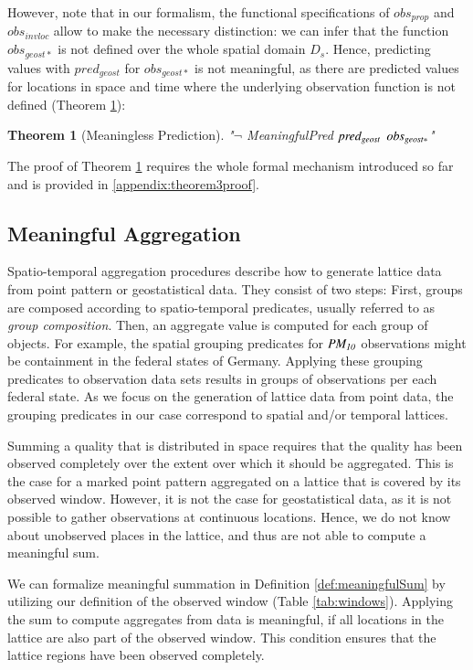 \documentclass[final,authoryear,1p,times]{elsarticle}
\newtheorem{theorem}{Theorem}
\begin{document}
However, note that in our formalism, the functional specifications of $obs_{prop}$ and $obs_{invloc}$ allow to make the necessary distinction: we can infer that the function $obs_{geost*}$ is not defined over the whole spatial domain $D_s$. Hence, predicting values with $pred_{geost}$ for $obs_{geost*}$ is not meaningful, as there are predicted values for locations in space and time where the underlying observation function is not defined (Theorem \ref{the:notMeaningful}):
\begin{theorem}[Meaningless Prediction]
\label{the:notMeaningful}
"$\neg$ MeaningfulPred ${\it pred_{geost}}$  ${\it obs_{geost*}}$"
\end{theorem}

The proof of Theorem \ref{the:notMeaningful} requires the whole formal mechanism introduced so far and is provided in \ref{appendix:theorem3proof}.

\subsection{Meaningful Aggregation}
\label{aggregation}

Spatio-temporal aggregation procedures describe how to generate lattice data from point pattern or geostatistical data. They consist of two steps: First, groups are composed according to spatio-temporal predicates, usually referred to as \textit{group composition}. Then, an aggregate value is computed for each group of objects. For example, the spatial grouping predicates for ${\it PM_{10}}$ observations might be containment in the federal states of Germany. Applying these grouping predicates to observation data sets results in groups of observations per each federal state. As we focus on the generation of lattice data from point data, the grouping predicates in our case correspond to spatial and/or temporal lattices. 

Summing a quality that is distributed in space requires that the quality has been observed completely over the extent over which it should be aggregated. This is the case for a marked point pattern aggregated on a lattice that is covered by its observed window. However, it is not the case for geostatistical data, as it is not possible to gather observations at continuous locations. Hence, we do not know about unobserved places in the lattice, and thus are not able to compute a meaningful sum. 

We can formalize meaningful summation in Definition \ref{def:meaningfulSum} by utilizing our definition of the observed window (Table \ref{tab:windows}). Applying the sum to compute aggregates from data is meaningful, if all locations in the lattice are also part of the observed window. This condition ensures that the lattice regions have been observed completely.
\end{document}
